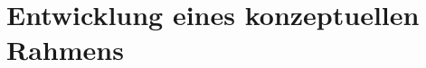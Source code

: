 \section{Entwicklung eines konzeptuellen Rahmens}



\begin{comment}
\label{cha:entwicklung}
Dieses Kapitel dient der Entwicklung eines konzeptuellen Rahmens auf Basis theoretischer Grundlagen, vorausgesetzt sie verfolgen einen positivistischen Ansatz. Hierfür leiten Sie Hypothesen aus verschiedenen sinnvoll kombinierten Quellen her. Hierdurch generieren Sie aus bestehendem Wissen neues Wissen, was eine Eigenleistung und somit ein wichtiger Bestandteil Ihrer Arbeit darstellt.

Sollte Ihre Arbeit nicht positivistisch ausgelegt sein, stellt dieser Abschnitt kein Pflichtkapitel der Arbeit dar. Alternativ beschreiben Sie Anforderungen für ein mögliches Konzept oder verzichten vollständig auf dieses Kapitel.

\textbf{Setzen Sie sich frühzeitig mit Ihrem Betreuer in Verbindung, um Ihre Gliederung abzustimmen und mögliche Missverständnisse zu beseitigen.}

Im Folgenden werden einige allgemeine Hinweise zu den Themen richtiges Zitieren und Literaturrecherche gegeben.


\subsection{Quellen und richtiges Zitieren}
Quellen können in Fußnote oder direkt im Text platziert werden. Alles was nicht Ihr eigenes Gedankengut darstellt, muss mit einer entsprechenden Quelle belegt werden. Hierbei können wörtliche und indirekte Zitate verwendet werden. Wörtliche Zitate sind immer mit der Seitennummer der Quelle anzugeben.

Beispiel für ein direktes Zitat:


Beispiel für ein indirektes Zitat:



\end{comment}
